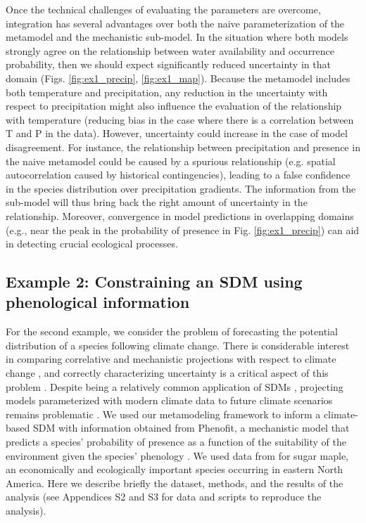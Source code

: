 \documentclass[11pt]{article}
\begin{document}
Once the technical challenges of evaluating the parameters are overcome, integration has several advantages over both the naive parameterization of the metamodel and the mechanistic sub-model. 
In the situation where both models strongly agree on the relationship between water availability and occurrence probability, then we should expect significantly reduced uncertainty in that domain (Figs. \ref{fig:ex1_precip}, \ref{fig:ex1_map}).
Because the metamodel includes both temperature and precipitation, any reduction in the uncertainty with respect to precipitation might also influence the evaluation of the relationship with temperature (reducing bias in the case where there is a correlation between T and P in the data). 
However, uncertainty could increase in the case of model disagreement.
For instance, the relationship between precipitation and presence in the naive metamodel could be caused by a spurious relationship (e.g. spatial autocorrelation caused by historical contingencies), leading to a false confidence in the species distribution over precipitation gradients. 
The information from the sub-model will thus bring back the right amount of uncertainty in the relationship.
Moreover, convergence in model predictions in overlapping domains (e.g., near the peak in the probability of presence in Fig. \ref{fig:ex1_precip}) can aid in detecting crucial ecological processes.



%
%


\subsection*{Example 2: Constraining an SDM using phenological information}
For the second example, we consider the problem of forecasting the potential distribution of a species following climate change.
There is considerable interest in comparing correlative and mechanistic projections with respect to climate change \citep{Morin2009}, and correctly characterizing uncertainty is a critical aspect of this problem \citep{Cheaib2012}.
Despite being a relatively common application of SDMs \citep{Guisan2005}, projecting models parameterized with modern climate data to future climate scenarios remains problematic \citep{Araujo2006}.
We used our metamodeling framework to inform a climate-based SDM with information obtained from Phenofit, a mechanistic model that predicts a species' probability of presence as a function of the suitability of the environment given the species' phenology \citep{Chuine2001, Morin2009}.
We used data from \citet{Morin2009} for sugar maple, an economically and ecologically important species occurring in eastern North America.
Here we describe briefly the dataset, methods, and the results of the analysis (see Appendices S2 and S3 for data and scripts to reproduce the analysis).
\end{document}
